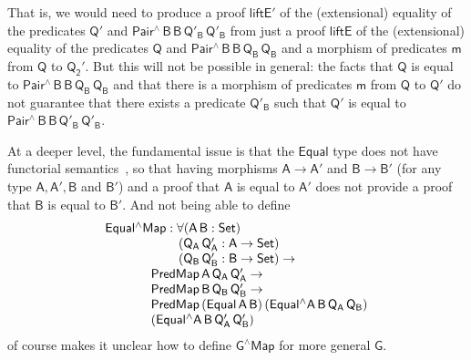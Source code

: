 \documentclass[sigplan,screen]{acmart}
\begin{document}
That is, we would need to produce a proof $\mathsf{liftE'}$ of the
(extensional) equality of the predicates $\mathsf{Q'}$ and
$\mathsf{Pair^{\wedge}\,B\,B\,Q'_B\,Q'_B}$ from just a proof
$\mathsf{liftE}$ of the (extensional) equality of the predicates
$\mathsf{Q}$ and $\mathsf{Pair^{\wedge}\,B\,B\,Q_B\,Q_B}$ and a
morphism of predicates $\mathsf{m}$ from $\mathsf{Q}$ to
$\mathsf{Q_2'}$.
But this will not be possible in general: the facts that $\mathsf{Q}$
is equal to $\mathsf{Pair^{\wedge}\,B\,B\,Q_B\,Q_B}$ and that there is
a morphism of predicates $\mathsf{m}$ from $\mathsf{Q}$ to
$\mathsf{Q'}$ do not guarantee that there exists a predicate
$\mathsf{Q'_B}$ such that $\mathsf{Q'}$ is equal to
$\mathsf{Pair^{\wedge}\,B\,B\,Q'_B\,Q'_B}$.

At a deeper level, the fundamental issue is that the $\mathsf{Equal}$
type does not have functorial semantics~\cite{jg21}, so that having
morphisms $\mathsf{A \to A'}$ and $\mathsf{B \to B'}$ (for any type
$\mathsf{A, A', B}$ and $\mathsf{B'}$) and a proof that $\mathsf{A}$
is equal to $\mathsf{A'}$ does not provide a proof that $\mathsf{B}$
is equal to $\mathsf{B'}$. And not being able to define
\[\begin{array}{l}
\mathsf{Equal^\wedge Map : \forall (A\, B : Set)}\\
\hspace*{0.8in}\mathsf{(Q_A\, Q_A' : A \to Set)}\\
\hspace*{0.8in}\mathsf{(Q_B\, Q_B' : B \to Set) \to}\\
\hspace*{0.5in}\mathsf{PredMap\,A\,Q_A\,Q_A' \to}\\
\hspace*{0.5in}\mathsf{PredMap\,B\,Q_B\,Q_B' \to}\\
\hspace*{0.5in}\mathsf{PredMap\,(Equal\,A\,B)\,(Equal^\wedge
  A\,B\,Q_A\,Q_B)}\\
\hspace*{0.5in}\mathsf{(Equal^\wedge A\,B\,Q_A'\,Q_B')}
\end{array}\]
of course makes it unclear how to define $\mathsf{G^\wedge Map}$ for
more general $\mathsf{G}$.
\end{document}
